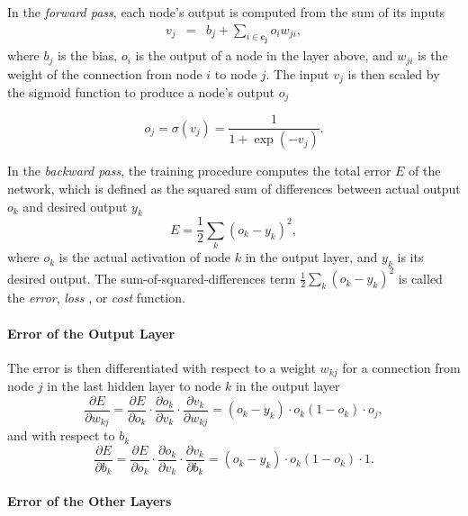 In the \emph{forward pass}, each node's output
is computed from the sum of its inputs
\begin{eqnarray*}
v_{j} & = & b_{j}+\sum_{i\in\mathbf{c_{j}}}o_{i}w_{ji},
\end{eqnarray*}
 where $b_{j}$ is the bias, $o_{i}$ is the output of a node in the
layer above, and $w_{ji}$ is the weight of the connection from node
$i$ to node $j$. The input $v_{j}$ is then scaled by the sigmoid
function to produce a node's output $o_{j}$

\[
o_{j}=\sigma(v_{j})=\frac{1}{1+\exp(-v_{j})}.
\]

In the \emph{backward pass}, the training procedure
computes the total error $E$ of the network, which is defined as
the squared sum of differences between actual output $o_{k}$ and
desired output $y_{k}$
\[
E=\frac{1}{2}\sum_{k}(o_{k}-y_{k})^{2},
\]
 where $o_{k}$ is the actual activation of node $k$ in the output
layer, and $y_{k}$ is its desired output. The sum-of-squared-differences
term $\frac{1}{2}\sum_{k}(o_{k}-y_{k})^{2}$ is called the \emph{error},\emph{
loss }, or \emph{cost} function.

\paragraph{Error of the Output Layer}

The error is then differentiated with respect to a weight $w_{kj}$
for a connection from node  $j$ in the last hidden layer to node
$k$ in the output layer 
\begin{equation}
\frac{\partial E}{\partial w_{kj}}=\frac{\partial E}{\partial o_{k}}\cdot\frac{\partial o_{k}}{\partial v_{k}}\cdot\frac{\partial v_{k}}{\partial w_{kj}}=(o_{k}-y_{k})\cdot o_{k}(1-o_{k})\cdot o_{j},\label{eq:backpropagation-error-wrt-weight}
\end{equation}
 and with respect to $b_{k}$
\[
\frac{\partial E}{\partial b_{k}}=\frac{\partial E}{\partial o_{k}}\cdot\frac{\partial o_{k}}{\partial v_{k}}\cdot\frac{\partial v_{k}}{\partial b_{k}}=(o_{k}-y_{k})\cdot o_{k}(1-o_{k})\cdot1.
\]

\paragraph{Error of the Other Layers}

